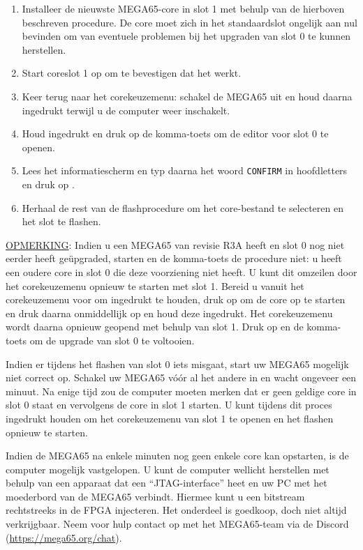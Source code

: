 \begin{enumerate}
  \item Installeer de nieuwste MEGA65-core in slot 1 met behulp van de hierboven beschreven procedure. De core moet zich in het standaardslot ongelijk aan nul bevinden om van eventuele problemen bij het upgraden van slot 0 te kunnen herstellen.  \item Start coreslot 1 op om te bevestigen dat het werkt.  \item Keer terug naar het corekeuzemenu: schakel de MEGA65 uit en houd daarna  ingedrukt terwijl u de computer weer inschakelt.  \item Houd \megasymbolkey ingedrukt en druk op de komma-toets om de editor voor slot 0 te openen.  \item Lees het informatiescherm en typ daarna het woord {\tt CONFIRM} in hoofdletters en druk op .  \item Herhaal de rest van de flashprocedure om het core-bestand te selecteren en het slot te flashen.
\end{enumerate}

\underline{OPMERKING}: Indien u een MEGA65 van revisie R3A heeft en slot 0 nog niet eerder heeft geüpgraded, starten \megasymbolkey en de komma-toets de procedure niet: u heeft een oudere core in slot 0 die deze voorziening niet heeft. U kunt dit omzeilen door het corekeuzemenu opnieuw te starten met slot 1. Bereid u vanuit het corekeuzemenu voor om  ingedrukt te houden, druk op  om de core op te starten en druk daarna onmiddellijk op  en houd deze ingedrukt. Het corekeuzemenu wordt daarna opnieuw geopend met behulp van slot 1. Druk op \megasymbolkey en de komma-toets om de upgrade van slot 0 te voltooien.

Indien er tijdens het flashen van slot 0 iets misgaat, start uw MEGA65 mogelijk niet correct op. Schakel uw MEGA65 vóór al het andere in en wacht ongeveer een minuut. Na enige tijd zou de computer moeten merken dat er geen geldige core in slot 0 staat en vervolgens de core in slot 1 starten. U kunt tijdens dit proces  ingedrukt houden om het corekeuzemenu van slot 1 te openen en het flashen opnieuw te starten.

Indien de MEGA65 na enkele minuten nog geen enkele core kan opstarten, is de computer mogelijk vastgelopen. U kunt de computer wellicht herstellen met behulp van een apparaat dat een ``JTAG-interface'' heet en uw PC met het moederbord van de MEGA65 verbindt. Hiermee kunt u een bitstream rechtstreeks in de FPGA injecteren. Het onderdeel is goedkoop, doch niet altijd verkrijgbaar. Neem voor hulp contact op met het MEGA65-team via de Discord (\url{https://mega65.org/chat}).

